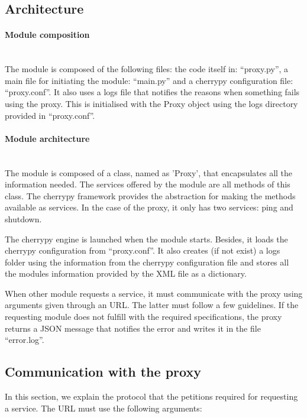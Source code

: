 \subsection{Architecture}

\paragraph{Module composition} \hspace{0pt} \\
The module is composed of the following files: the code itself in: “proxy.py”, a main file for initiating the module: “main.py” and a cherrypy configuration file: “proxy.conf”. It also uses a logs file that notifies the reasons when something fails using the proxy. This is initialised with the Proxy object using the logs directory provided in “proxy.conf”.

\paragraph{Module architecture} \hspace{0pt} \\

The module is composed of a class, named as ’Proxy’, that encapsulates all the information needed. The services offered by the module are all methods of this class. The cherrypy framework provides the abstraction for making the methods available as services. In the case of the proxy, it only has two services: ping and shutdown.

The cherrypy engine is launched when the module starts. Besides, it loads the cherrypy configuration from “proxy.conf”. It also creates (if not exist) a logs folder using the information from the cherrypy configuration file and stores all the modules information provided by the XML file as a dictionary.

When other module requests a service, it must communicate with the proxy using arguments given through an URL. The latter must follow a few guidelines. If the requesting module does not fulfill with the required specifications, the proxy returns a JSON message that notifies the error and writes it in the file “error.log”.

\subsection{Communication with the proxy}

In this section, we explain the protocol that the petitions required for requesting a service. The URL must use the following arguments:

